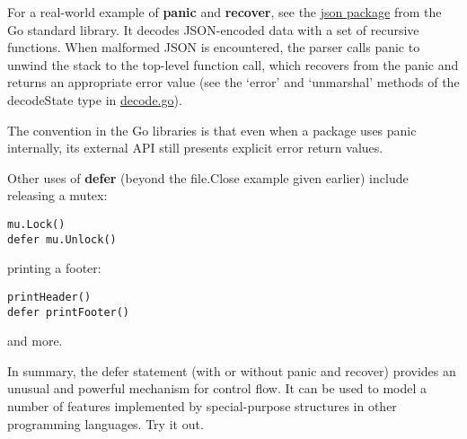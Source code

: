 For a real-world example of \textbf{panic} and \textbf{recover}, see the
\href{http://golang.org/pkg/encoding/json/}{json package} from the Go standard library.
It decodes JSON-encoded data with a set of recursive functions. When
malformed JSON is encountered, the parser calls panic to unwind the
stack to the top-level function call, which recovers from the panic and
returns an appropriate error value (see the `error' and `unmarshal'
methods of the decodeState type in
\href{http://golang.org/src/pkg/encoding/json/decode.go}{decode.go}).

The convention in the Go libraries is that even when a package uses
panic internally, its external API still presents explicit error return
values.

Other uses of \textbf{defer} (beyond the file.Close example given
earlier) include releasing a mutex:

\begin{Verbatim}[frame=single]
mu.Lock()
defer mu.Unlock()
\end{Verbatim}

printing a footer:

\begin{Verbatim}[frame=single]
printHeader()
defer printFooter()
\end{Verbatim}

and more.

In summary, the defer statement (with or without panic and recover)
provides an unusual and powerful mechanism for control flow. It can be
used to model a number of features implemented by special-purpose
structures in other programming languages. Try it out.
